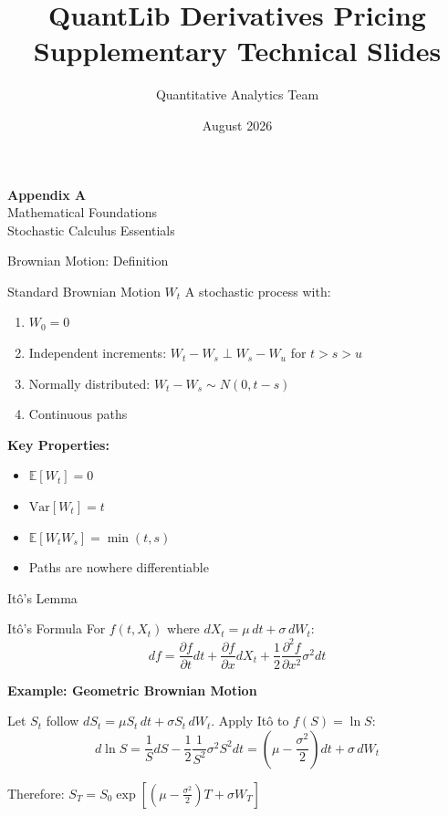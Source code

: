 \documentclass[aspectratio=169,11pt]{beamer}
\title[Supplementary Content]{\textbf{QuantLib Derivatives Pricing}\\Supplementary Technical Slides}
\author{Quantitative Analytics Team}
\date{August 2026}
\begin{document}

\begin{frame}
\titlepage
\end{frame}

\begin{frame}{}
\begin{center}
\Huge\textbf{Appendix A}\\[1cm]
\Large Mathematical Foundations\\[0.5cm]
\normalsize Stochastic Calculus Essentials
\end{center}
\end{frame}

\begin{frame}{Brownian Motion: Definition}
\begin{block}{Standard Brownian Motion $W_t$}
A stochastic process with:
\begin{enumerate}
    \item $W_0 = 0$
    \item Independent increments: $W_t - W_s \perp W_s - W_u$ for $t > s > u$
    \item Normally distributed: $W_t - W_s \sim N(0, t-s)$
    \item Continuous paths
\end{enumerate}
\end{block}

\textbf{Key Properties:}
\begin{itemize}
    \item $\mathbb{E}[W_t] = 0$
    \item $\text{Var}[W_t] = t$
    \item $\mathbb{E}[W_t W_s] = \min(t, s)$
    \item Paths are nowhere differentiable
\end{itemize}
\end{frame}

\begin{frame}{Itô's Lemma}
\begin{block}{Itô's Formula}
For $f(t, X_t)$ where $dX_t = \mu\,dt + \sigma\,dW_t$:
\[
df = \frac{\partial f}{\partial t}dt + \frac{\partial f}{\partial x}dX_t + \frac{1}{2}\frac{\partial^2 f}{\partial x^2}\sigma^2 dt
\]
\end{block}

\textbf{Example: Geometric Brownian Motion}

Let $S_t$ follow $dS_t = \mu S_t\,dt + \sigma S_t\,dW_t$. Apply Itô to $f(S) = \ln S$:
\[
d\ln S = \frac{1}{S}dS - \frac{1}{2}\frac{1}{S^2}\sigma^2 S^2 dt = \left(\mu - \frac{\sigma^2}{2}\right)dt + \sigma\,dW_t
\]

Therefore: $S_T = S_0 \exp\left[(\mu - \frac{\sigma^2}{2})T + \sigma W_T\right]$
\end{frame}
\end{document}
